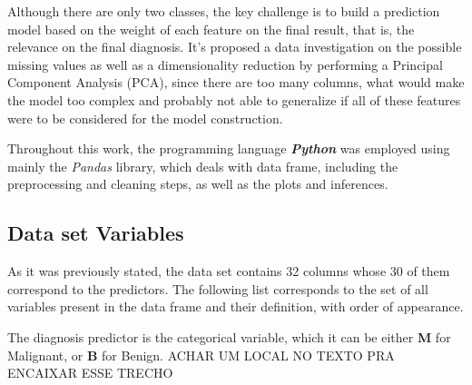 \documentclass[conference]{IEEEtran}
\newcommand{\reviewUrgent}[1]{{\color{red} #1}} %
\begin{document}
Although there are only two classes, the key challenge is to build a prediction
model based on the weight of each feature on the final result, that is, the relevance
on the final diagnosis. It's proposed a data investigation on the possible missing values as 
well as a dimensionality reduction by performing a Principal Component Analysis (PCA), 
since there are too many columns, what would make the model too complex and probably not able 
to generalize if all of these features were to be considered for the model construction. 

Throughout this work, the programming language \textit{\textbf{Python}} was employed 
using mainly the \textit{Pandas} library, which deals with data frame, including the 
preprocessing and cleaning steps, as well as the plots and inferences. 


\subsection{Data set Variables}

As it was previously stated, the data set contains 32 columns whose 30 of them 
correspond to the predictors. The following list corresponds to the set of all 
variables present in the data frame and their definition, with order of appearance. 

The diagnosis predictor is the categorical variable, which it can be either \textbf{M} for Malignant, or \textbf{B} for Benign. 
\reviewUrgent{ACHAR UM LOCAL NO TEXTO PRA ENCAIXAR ESSE TRECHO}
\end{document}
